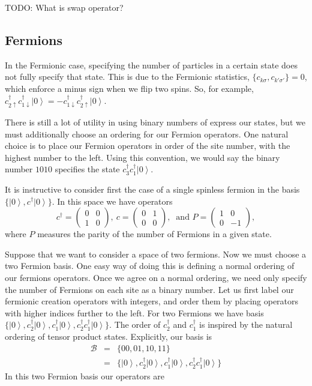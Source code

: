 \documentclass{article}
\newcommand{\ket}[1]{\left| #1 \right>} %
\theoremstyle{definition}
\begin{document}
TODO: What is swap operator?

\subsection{Fermions}
In the Fermionic case, specifying the number of particles in a certain state does not fully specify that state. This is due to the Fermionic statistics, $\{c_{k\sigma},c_{k'\sigma'}\} = 0$, which enforce a minus sign when we flip two spins. So, for example, $c^\dag_{2\uparrow}c^\dag_{1\downarrow} \ket{0} = -c^\dag_{1\downarrow} c^\dag_{2\uparrow} \ket{0}$.

There is still a lot of utility in using binary numbers of express our states, but we must additionally choose an ordering for our Fermion operators. One natural choice is to place our Fermion operators in order of the site number, with the highest number to the left. Using this convention, we would say the binary number $1010$ specifies the state $c_3^\dag c_1^\dag \ket{0}$.

It is instructive to consider first the case of a single spinless fermion in the basis $\{\ket{0},c^\dag \ket{0}\}$. In this space we have operators
\begin{equation}
c^\dag =
\begin{pmatrix}
0 & 0\\
1 & 0
\end{pmatrix}, \
c =
\begin{pmatrix}
0 & 1\\
0 & 0
\end{pmatrix}, \ \text{ and }
P =
\begin{pmatrix}
1 & 0\\
0 & -1
\end{pmatrix},
\end{equation}
where $P$ measures the parity of the number of Fermions in a given state.

Suppose that we want to consider a space of two fermions. Now we must choose a two Fermion basis. One easy way of doing this is defining a normal ordering of our fermions operators. Once we agree on a normal ordering, we need only specify the number of Fermions on each site as a binary number. Let us first label our fermionic creation operators with integers, and order them by placing operators with higher indices further to the left. For two Fermions we have basis $\{\ket{0},c^\dag_2 \ket{0},c^\dag_1 \ket{0},c^\dag_2 c^\dag_1 \ket{0}\}$. The order of $c^\dag_2$ and $c^\dag_1$ is inspired by the natural ordering of tensor product states. Explicitly, our basis is
\begin{eqnarray}
\mathcal{B} &=& \{00, 01, 10, 11\} \\
&=& \{\ket{0}, c_2^\dag \ket{0}, c_1^\dag \ket{0}, c_2^\dag c_1^\dag \ket{0} \}
\end{eqnarray}
In this two Fermion basis our operators are
\end{document}
